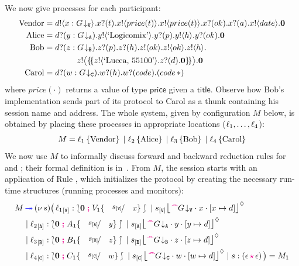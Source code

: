 \documentclass[runningheads,plain]{llncs}
\begin{document}
We now give processes for each participant:
\begin{align*}
\text{Vendor} & =  d ! \langle x:G\!\downarrow_{\mathtt{V}} \rangle .x ? (t) .x ! \langle price(t) \rangle .x ! \langle price(t) \rangle . x ? (ok) .x ? (a) . x ! \langle date \rangle .\mathbf{0}  
\\
\text{Alice} & =  d ? (y:G\!\downarrow_{\mathtt{A}}) .y ! \langle \text{`Logicomix'} \rangle .y ? (p) .y ! \langle h \rangle .y ? (ok) .\mathbf{0}  
\\
\text{Bob} & =  d ? (z:G\!\downarrow_{\mathtt{B}}) .z ? (p) .z ? (h) .z ! \langle ok \rangle .z ! \langle ok \rangle .z ! \langle h \rangle .
  \\
  & \qquad \qquad z ! \big\langle \{\!\{z ! \langle \text{`Lucca, 55100'} \rangle .z ? (d) .\mathbf{0}\}\!\} \big\rangle .\mathbf{0}
  \\
\text{Carol} & =  d ? (w:G\!\downarrow_{\mathtt{C}}) .w ? (h) .w ? (code) .(code\, {\ast})
\end{align*}
where $price(\cdot)$ returns a value of type $\mathsf{price}$ given a $\mathsf{title}$.
Observe how Bob's implementation sends part of its protocol to Carol as a thunk containing 
his session name and address. 
The whole system, given by configuration $M$ below, is obtained by placing these processes   in appropriate locations ($\ell_1, \ldots, \ell_4$):
$$
M = \ell_1\left\{\text{Vendor}\right\} 
\;|\;
\ell_2\left\{\text{Alice}\right\} 
\;|\;
\ell_3\left\{\text{Bob}\right\} 
\;|\; 
\ell_4\left\{\text{Carol}\right\} 
$$
We now use $M$ to informally discuss forward and backward reduction rules for \fw and \bk; their formal definition is in~\cite{DBLP:conf/ppdp/MezzinaP17}.
From $M$, the session starts with an application of 
Rule , which initializes the protocol by creating the necessary run-time structures (running processes and monitors):
\begin{align*}
M & \fw  \news{s}\big(\, 
\np{\key{{\loc_1}}{\pS}}{ \conf{\inact}{V_1\subst{\epS}{x}}} \Par 
\hmoni{\ep{s}{\pS}}{\past \tproj{G}{\pS}}{x}{\upd{x}{d}}  
\\
& \Par \np{\key{{\loc_2}}{\pA}}{ \conf{\inact}{A_1\subst{\epA}{y}}} \Par 
\hmoni{\ep{s}{\pA}}{\past \tproj{G}{\pA}}{y}{\upd{y}{d}} 
\\
& \Par \np{\key{{\loc_3}}{\pB}}{ \conf{\inact}{B_1\subst{\epB}{z}}} \Par 
\hmoni{\ep{s}{\pB}}{\past \tproj{G}{\pB}}{z}{\upd{z}{d}} 
\\
& \Par \np{\key{{\loc_4}}{\pC}}{ \conf{\inact}{C_1\subst{\epC}{w}}} \Par 
\hmoni{\ep{s}{\pC}}{\past \tproj{G}{\pC}}{w}{\upd{w}{d}}  
  \Par \codah{s}{\emp}{\emp}{}~\big)  = M_1
\end{align*}
\end{document}
